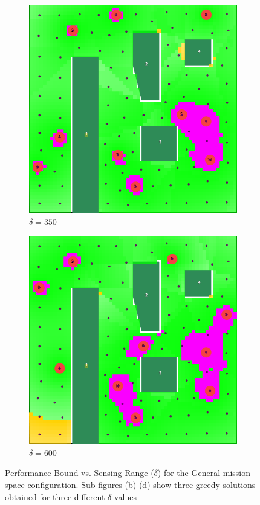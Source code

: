 \documentclass[conference]{IEEEtran}
\begin{document}
\begin{figure}[t]
\begin{subfigure}[t]{0.105\textwidth}
        \includegraphics[width=\textwidth]{Figures/Gen1_2.png}
        \caption{$\delta=350$}
    \end{subfigure}\hspace{3mm}
    \begin{subfigure}[t]{0.105\textwidth}
        \centering
        \includegraphics[width=\textwidth]{Figures/Gen1_3.png}
        \caption{$\delta=600$}
    \end{subfigure}
    \caption{Performance Bound vs. Sensing Range ($\delta$) for the General mission space configuration. Sub-figures (b)-(d) show three greedy solutions obtained for three different $\delta$ values}
    \label{Fig:GeneralConfigBetaVsRange}
\end{figure}
\end{document}
